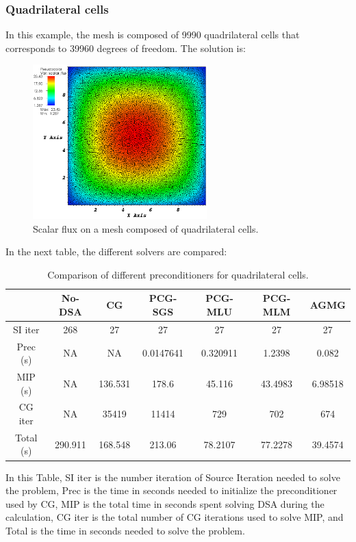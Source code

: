 \subsubsection{Quadrilateral cells}
In this example, the mesh is composed of 9990 quadrilateral cells that corresponds 
to 39960 degrees of freedom. The solution is:
\begin{figure}[H]
\centering
\includegraphics[width=0.6\textwidth]{./Dsa/homog_quad_crop}
\caption{Scalar flux on a mesh composed of quadrilateral cells.}
\end{figure}
In the next table, the different solvers are compared:
\begin{table}[H]
\begin{center}
\caption{Comparison of different preconditioners for quadrilateral cells.}
\begin{tabular}{|c|c|c|c|c|c|c|}
\hline
& No-DSA & CG & PCG-SGS &  PCG-MLU & PCG-MLM & AGMG\\
\hline
SI iter   & 268     & 27      & 27        & 27       & 27      & 27 \\
Prec (s)  & NA      & NA      & 0.0147641 & 0.320911 & 1.2398  & 0.082\\
MIP (s)   & NA      & 136.531 & 178.6     & 45.116   & 43.4983 & 6.98518\\
CG iter   & NA      & 35419   & 11414     & 729      & 702     & 674\\
Total (s) & 290.911 & 168.548 & 213.06    & 78.2107  & 77.2278 & 39.4574\\
\hline
\end{tabular}
\end{center}
\end{table}
In this Table, SI iter is the number iteration of Source Iteration
needed to solve the problem, Prec is the time in seconds needed to
initialize the preconditioner used by CG, MIP is the total time in
seconds spent solving DSA during the calculation, CG iter is the total number 
of CG iterations used to solve MIP, and Total is the time in
seconds needed to solve the problem.

